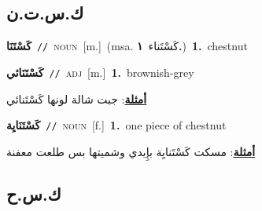 \documentclass[10pt,a4paper,twoside]{article} %
\begin{document}
\begin{multicols}{2}
\vspace{-3mm}
\subsection*{\color{blue}\foreignlanguage{arabic}{ك.س.ت.ن}\color{blue}{}} 

{\setlength\topsep{0pt}\textbf{\foreignlanguage{arabic}{كَسْتَنَا}}\ {\color{gray}\texttt{//}\color{black}}\ \textsc{noun}\ [m.]\ \color{gray}(msa. \foreignlanguage{arabic}{كَسْتَناء}~\foreignlanguage{arabic}{\textbf{١.}})\color{black}\ \textbf{1.}~chestnut\ } \vspace{2mm}

{\setlength\topsep{0pt}\textbf{\foreignlanguage{arabic}{كَسْتَنَائي}}\ {\color{gray}\texttt{//}\color{black}}\ \textsc{adj}\ [m.]\ \textbf{1.}~brownish-grey\  \begin{flushright}\color{gray}\foreignlanguage{arabic}{\textbf{\underline{\foreignlanguage{arabic}{أمثلة}}}: جبت شالة لونها كَسْتَنائي}\end{flushright}\color{black}} \vspace{2mm}

{\setlength\topsep{0pt}\textbf{\foreignlanguage{arabic}{كَسْتَنَايِة}}\ {\color{gray}\texttt{//}\color{black}}\ \textsc{noun}\ [f.]\ \textbf{1.}~one piece of chestnut\  \begin{flushright}\color{gray}\foreignlanguage{arabic}{\textbf{\underline{\foreignlanguage{arabic}{أمثلة}}}: مسكت كَسْتَنايِة بإِيدي وشميتها بس طلعت معفنة}\end{flushright}\color{black}} \vspace{2mm}

\vspace{-3mm}
\subsection*{\color{blue}\foreignlanguage{arabic}{ك.س.ح}\color{blue}{}} 


\end{multicols}
\end{document}
